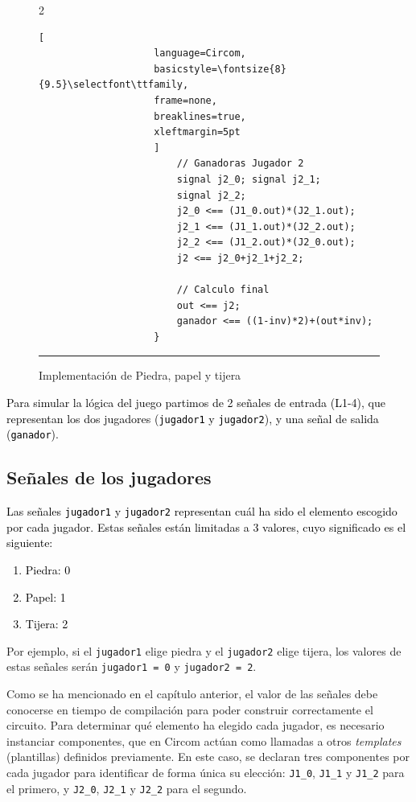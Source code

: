 \documentclass[a4paper,12pt]{report}
\begin{document}
\begin{figure}[H]
\begin{minipage}{\textwidth}
\begin{multicols}{2}
\begin{lstlisting}[
					language=Circom,
					basicstyle=\fontsize{8}{9.5}\selectfont\ttfamily,
					frame=none, 
					breaklines=true,
					xleftmargin=5pt
					]
						// Ganadoras Jugador 2
						signal j2_0; signal j2_1; 
						signal j2_2;
						j2_0 <== (J1_0.out)*(J2_1.out);
						j2_1 <== (J1_1.out)*(J2_2.out);
						j2_2 <== (J1_2.out)*(J2_0.out);
						j2 <== j2_0+j2_1+j2_2;
						
						// Calculo final
						out <== j2; 
						ganador <== ((1-inv)*2)+(out*inv);
					}
				\end{lstlisting}
			\end{multicols}
		\end{minipage}
		
		\vspace{2pt}
		\caption{Implementación de Piedra, papel y tijera}
		\label{cod:piedra-papel-tijera-declarativa}
		\vspace{5pt}
		\hrule 
	\end{figure}
	
	
	\vspace{0.2cm}
	\noindent \textcolor{black}{Para simular la lógica del juego partimos de 2 señales de entrada (L1-4), que representan los dos jugadores (\texttt{jugador1} y \texttt{jugador2}), y una señal de salida (\texttt{ganador}).}
	
	\subsection{Señales de los jugadores}
	\vspace{0.2cm}
	\noindent \textcolor{black}{Las señales \texttt{jugador1} y \texttt{jugador2} representan cuál ha sido el elemento escogido por cada jugador. Estas señales están limitadas a 3 valores, cuyo significado es el siguiente:}
	
	\textcolor{black}{
		\begin{enumerate}
			\item Piedra: 0
			\item Papel: 1
			\item Tijera: 2
		\end{enumerate}
	}
	
	\vspace{0.2cm}
	\noindent Por ejemplo, si el \texttt{jugador1} elige piedra y el \texttt{jugador2} elige tijera, los valores de estas señales serán \texttt{jugador1 = 0} y \texttt{jugador2 = 2}.
	
	\vspace{0.2cm}
	\noindent Como se ha mencionado en el capítulo anterior, el valor de las señales debe conocerse en tiempo de compilación para poder construir correctamente el circuito. Para determinar qué elemento ha elegido cada jugador, es necesario instanciar componentes, que en Circom actúan como llamadas a otros \textit{templates} (plantillas) definidos previamente. En este caso, se declaran tres componentes por cada jugador para identificar de forma única su elección: \texttt{J1\_0}, \texttt{J1\_1} y \texttt{J1\_2} para el primero, y \texttt{J2\_0}, \texttt{J2\_1} y \texttt{J2\_2} para el segundo.
	
\end{document}
